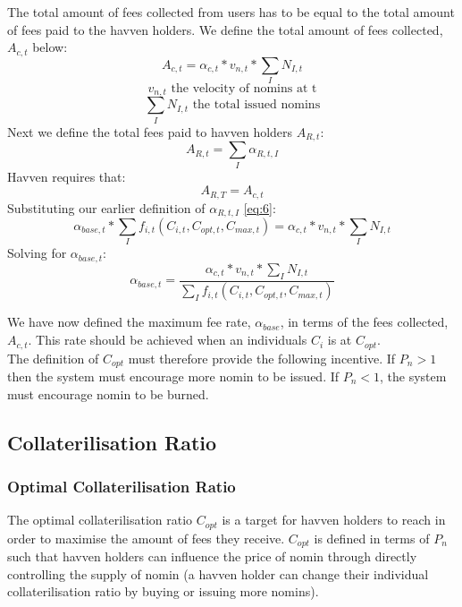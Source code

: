 The total amount of fees collected from users has to be equal to the total amount of fees paid to the havven holders. We define the total amount of fees collected, $A_{c,t}$ below: \\
\begin{equation}
A_{c,t}  = \alpha_{c,t} * v_{n,t} * \sum\limits_I N_{I,t}  \label{eq:8}
\end{equation}
$$ v_{n,t} \text{ the velocity of nomins at t} $$
$$  \sum\limits_I N_{I,t} \text{ the total issued nomins} $$
Next we define the total fees paid to havven holders $A_{R,t}$: \\
\begin{equation}
A_{R,t} = \sum\limits_I \alpha_{R,t,I} \label{eq:9}
\end{equation}
Havven requires that: \\
$$ A_{R,T} =  A_{c,t} $$
Substituting our earlier definition of $\alpha_{R,t,I}$ \eqref{eq:6}: \\
$$ \alpha_{base,t} *\sum\limits_I f_{i,t}(C_{i,t}, C_{opt,t}, C_{max,t}) =  \alpha_{c,t} * v_{n,t} * \sum\limits_I N_{I,t} $$
Solving for $\alpha_{base,t} $:\\
\begin{equation}
\alpha_{base,t} = \frac{\alpha_{c,t} * v_{n,t} * \sum\limits_I N_{I,t}}{\sum\limits_I f_{i,t}(C_{i,t}, C_{opt,t},C_{max,t})} \label{eq:10}
\end{equation}

\noindent We have now defined the maximum fee rate, $\alpha_{base}$, in terms of the fees collected, $A_{c,t}$. This rate should be achieved when an individuals $C_i$ is at $C_{opt}$. \\

\noindent The definition of $C_{opt}$ must therefore provide the following incentive. If $P_n > 1$ then the system must encourage more nomin to be issued. If $P_n < 1$, the system must encourage nomin to be burned. 

\newpage

\subsection{Collaterilisation Ratio}
\subsubsection{Optimal Collaterilisation Ratio}

\noindent The optimal collaterilisation ratio $C_{opt}$ is a target for havven holders to reach in order to maximise the amount of fees they receive. $C_{opt}$ is defined in terms of $P_n$ such that havven holders can influence the price of nomin through directly controlling the supply of nomin (a havven holder can change their individual collaterilisation ratio by buying or issuing more nomins). \\
 
